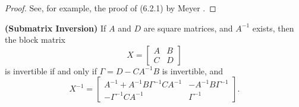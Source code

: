 \documentclass{article}
\begin{document}
	\begin{proof}
	See, for example, the proof of (6.2.1) by Meyer \cite{meyer_2008}.
	\end{proof}
	
	\begin{lem} \textnormal{\bf(Submatrix Inversion)}
		\label{lem:submatrix_inversion}
		If $A$ and $D$ are square matrices, and $A^{-1}$ exists, then the block matrix
		\begin{equation}
			X = \left[\begin{matrix}
				A & B \\
				C & D
			\end{matrix}\right]
		\end{equation}
		is invertible if and only if $\Gamma = D - CA^{-1}B$ is invertible, and
		\begin{equation}
			X^{-1} = \left[\begin{matrix}
				A^{-1} + A^{-1}B\Gamma^{-1}CA^{-1} & -A^{-1}B\Gamma^{-1} \\
				-\Gamma^{-1}CA^{-1}& \Gamma^{-1}
			\end{matrix}\right].
		\end{equation}
	\end{lem}
	
\end{document}

